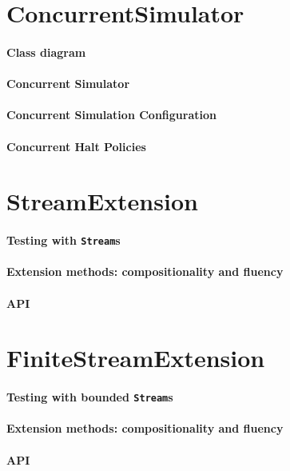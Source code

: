 \section{ConcurrentSimulator}
\paragraph{Class diagram}
\paragraph{Concurrent Simulator}
\paragraph{Concurrent Simulation Configuration}
\paragraph{Concurrent Halt Policies}

\section{StreamExtension}
\paragraph{Testing with \texttt{Stream}s}
\paragraph{Extension methods: compositionality and fluency}
\paragraph{API}

\section{FiniteStreamExtension}
\paragraph{Testing with bounded \texttt{Stream}s}
\paragraph{Extension methods: compositionality and fluency}
\paragraph{API}

